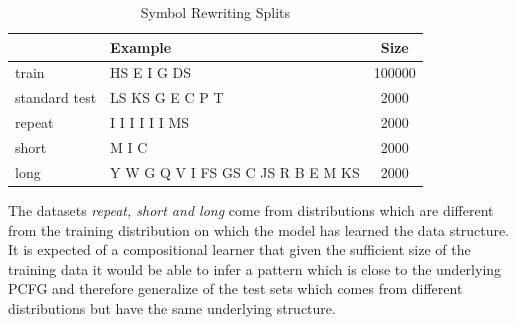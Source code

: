 \begin{table}[ht]
	\centering
	\begin{tabular}{l|lc}
		& Example & Size\\
		\hline
		train & HS E I G DS  & 100000 \\
		standard test & LS KS G E C P T & 2000 \\
		repeat & I I I I I I MS & 2000 \\
		short & M I C & 2000 \\
		long & Y W G Q V I FS GS C JS R B E M KS & 2000 \\
	\end{tabular}
	\caption{Symbol Rewriting Splits}
	\label{sr:stats}
\end{table}

The datasets \textit{repeat, short and long} come from distributions which are different from the training distribution on which the model has learned the data structure. It is expected of a compositional learner that given the sufficient size of the training data it would be able to infer a pattern which is close to the underlying PCFG and therefore generalize of the test sets which comes from different distributions but have the same underlying structure.

